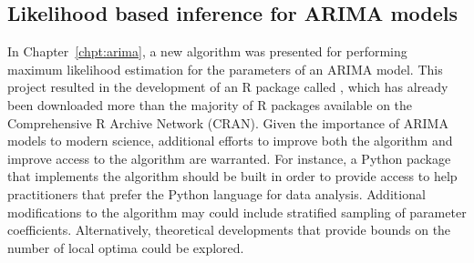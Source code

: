 \subsection*{Likelihood based inference for ARIMA models}

In Chapter~\ref{chpt:arima}, a new algorithm was presented for performing maximum likelihood estimation for the parameters of an ARIMA model.
This project resulted in the development of an R package called , which has already been downloaded more than the majority of R packages available on the Comprehensive R Archive Network (CRAN).
Given the importance of ARIMA models to modern science, additional efforts to improve both the algorithm and improve access to the algorithm are warranted.
For instance, a Python package that implements the algorithm should be built in order to provide access to help practitioners that prefer the Python language for data analysis.
Additional modifications to the algorithm may could include stratified sampling of parameter coefficients.
Alternatively, theoretical developments that provide bounds on the number of local optima could be explored. 
